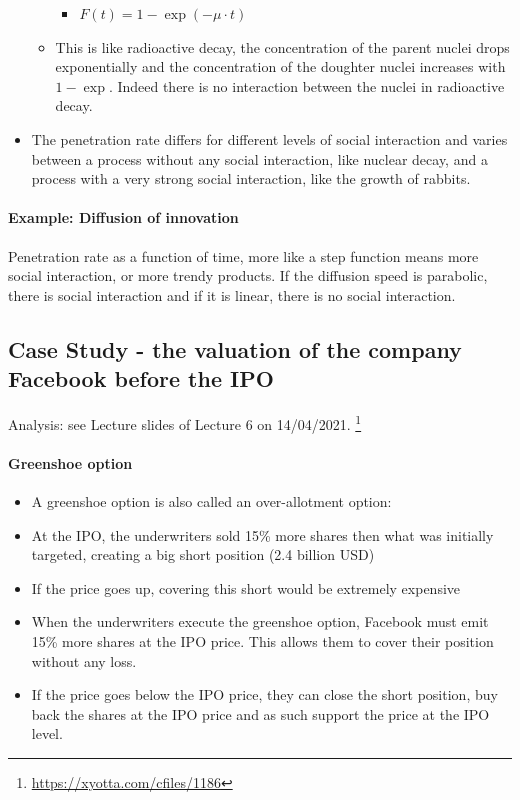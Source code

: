 \begin{itemize}
\begin{itemize}
\begin{itemize}
                \item $F(t) = 1 - \exp(-\mu \cdot t)$
            \end{itemize}
            \item This is like radioactive decay, the concentration of
                the parent nuclei drops exponentially and the concentration
                of the doughter nuclei increases with $1 - \exp$. Indeed
                there is no interaction between the nuclei in radioactive
                decay.
        \end{itemize}
    \item The penetration rate differs for different levels of social
        interaction and varies between a process without any social
        interaction, like nuclear decay, and a process with a very strong
        social interaction, like the growth of rabbits.
\end{itemize}

\paragraph{Example: Diffusion of innovation}

Penetration rate as a function of time, more like a step function means more
social interaction, or more trendy products. If the diffusion speed is
parabolic, there is social interaction and if it is linear, there is no
social interaction.

\subsection{Case Study - the valuation of the company Facebook before the IPO}

Analysis: see Lecture slides of Lecture 6 on 14/04/2021.
\footnote{\url{https://xyotta.com/cfiles/1186}}

\paragraph{Greenshoe option}
\begin{itemize}
    \item A greenshoe option is also called an over-allotment option:
    \item At the IPO, the underwriters sold 15\% more shares then what was
        initially targeted, creating a big short position (2.4 billion USD)
    \item If the price goes up, covering this short would be extremely expensive
    \item When the underwriters execute the greenshoe option, Facebook must
        emit 15\% more shares at the IPO price. This allows them to cover their
        position without any loss.
    \item If the price goes below the IPO price, they can close the short
        position, buy back the shares at the IPO price and as such support
        the price at the IPO level.
\end{itemize}


